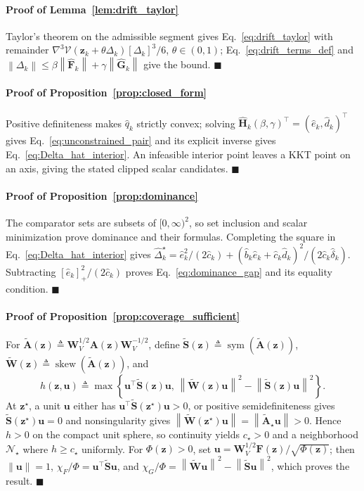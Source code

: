 \documentclass{article}
\theoremstyle{remark}
\newcommand{\norm}[1]{\left\lVert #1\right\rVert}
\newcommand{\sym}{\operatorname{sym}}
\newcommand{\skewop}{\operatorname{skew}}
\newcommand{\cN}{\mathcal{N}}
\newcommand{\bz}{\boldsymbol{z}}
\newcommand{\bu}{\boldsymbol{u}}
\newcommand{\bH}{\boldsymbol{H}}
\newcommand{\bW}{\boldsymbol{W}}
\newcommand{\bS}{\boldsymbol{S}}
\newcommand{\bA}{\boldsymbol{A}}
\newcommand{\bF}{\boldsymbol{F}}
\newcommand{\hatF}{\widehat{\boldsymbol{F}}}
\newcommand{\hatG}{\widehat{\boldsymbol{G}}}
\newcommand{\Vk}{\mathcal{V}}
\begin{document}
\paragraph{Proof of Lemma~\ref{lem:drift_taylor}}\label{app:drift_taylor}
Taylor's theorem on the admissible segment gives Eq.~\eqref{eq:drift_taylor} with remainder $\nabla^3\Vk(\bz_k+\theta\Delta_k)[\Delta_k]^3/6$, $\theta\in(0,1)$; Eq.~\eqref{eq:drift_terms_def} and $\norm{\Delta_k}\le\beta\norm{\hatF_k}+\gamma\norm{\hatG_k}$ give the bound.
\hfill$\blacksquare$

\paragraph{Proof of Proposition~\ref{prop:closed_form}}\label{app:closed_form}
Positive definiteness makes $\hat q_k$ strictly convex; solving $\widehat{\bH}_k(\beta,\gamma)^\top=(\hat e_k,\hat d_k)^\top$ gives Eq.~\eqref{eq:unconstrained_pair} and its explicit inverse gives Eq.~\eqref{eq:Delta_hat_interior}.
An infeasible interior point leaves a KKT point on an axis, giving the stated clipped scalar candidates.
\hfill$\blacksquare$

\paragraph{Proof of Proposition~\ref{prop:dominance}}\label{app:dominance}
The comparator sets are subsets of $[0,\infty)^2$, so set inclusion and scalar minimization prove dominance and their formulas.
Completing the square in Eq.~\eqref{eq:Delta_hat_interior} gives $\widehat\Delta_k^\star=\hat e_k^2/(2\hat c_k)+ (\hat b_k\hat e_k+\hat c_k\hat d_k)^2/(2\hat c_k\hat\delta_k)$.
Subtracting $[\hat e_k]_+^2/(2\hat c_k)$ proves Eq.~\eqref{eq:dominance_gap} and its equality condition.
\hfill$\blacksquare$

\paragraph{Proof of Proposition~\ref{prop:coverage_sufficient}}\label{app:coverage_sufficient}
For $\widetilde{\bA}(\bz)\triangleq\bW_V^{1/2}\bA(\bz)\bW_V^{-1/2}$, define $\widetilde{\bS}(\bz)\triangleq\sym(\widetilde{\bA}(\bz))$, $\widetilde{\bW}(\bz)\triangleq\skewop(\widetilde{\bA}(\bz))$, and
\[
h(\bz,\bu)\triangleq\max\!\left\{\bu^\top\widetilde{\bS}(\bz)\bu,\,\norm{\widetilde{\bW}(\bz)\bu}^2-\norm{\widetilde{\bS}(\bz)\bu}^2\right\}.
\]
At $\bz^\star$, a unit $\bu$ either has $\bu^\top\widetilde{\bS}(\bz^\star)\bu>0$, or positive semidefiniteness gives $\widetilde{\bS}(\bz^\star)\bu=0$ and nonsingularity gives $\norm{\widetilde{\bW}(\bz^\star)\bu}=\norm{\widetilde{\bA}_\star\bu}>0$.
Hence $h>0$ on the compact unit sphere, so continuity yields $c_\star>0$ and a neighborhood $\cN_\star$ where $h\ge c_\star$ uniformly.
For $\Phi(\bz)>0$, set $\bu=\bW_V^{1/2}\bF(\bz)/\sqrt{\Phi(\bz)}$; then $\norm{\bu}=1$, $\chi_F/\Phi=\bu^\top\widetilde{\bS}\bu$, and $\chi_G/\Phi=\norm{\widetilde{\bW}\bu}^{2}-\norm{\widetilde{\bS}\bu}^{2}$, which proves the result.
\hfill$\blacksquare$
\end{document}
